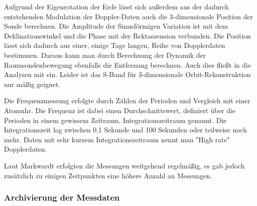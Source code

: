 Aufgrund der Eigenrotation der Erde lässt sich außerdem aus der dadurch entstehenden Modulation der Doppler-Daten auch die 3-dimensionale Position der Sonde berechnen. Die Amplitude der Sinusförmigen Variation ist mit dem Deklinationswinkel und die Phase mit der Rektaszension verbunden. Die Position lässt sich dadurch aus einer, einige Tage langen, Reihe von Dopplerdaten bestimmen. Daraus kann man durch Berechnung der Dynamik der Raumsondenbewegung ebenfalls die Entfernung berechnen. Auch dies fließt in die Analysen mit ein.\cite{Anderson2002} %
Leider ist das S-Band für 3-dimensionale Orbit-Rekonstruktion nur mäßig geignet.\cite{Turyshev2004}


Die Frequenzmessung erfolgte durch Zählen der Perioden und Vergleich mit einer Atomuhr\cite{Nieto2007}. %
Die Frequenz ist dabei einen Durchschnittswert, definiert über die Perioden in einem gewissem Zeitraum, Integrationszeitraum genannt. Die Integrationszeit lag zwischen 0,1 Sekunde und 100 Sekunden oder teilweise noch mehr\cite{Markwardt2002}. Daten mit sehr kurzem Integrationszeitraum nennt man "High rate" Dopplerdaten.

Laut Markwardt\cite{Markwardt2002} erfolgten die Messungen weitgehend regelmäßig, es gab jedoch zusätzlich zu einigen Zeitpunkten eine höhere Anzahl an Messungen.



\subsubsection{Archivierung der Messdaten}\label{archiv}


